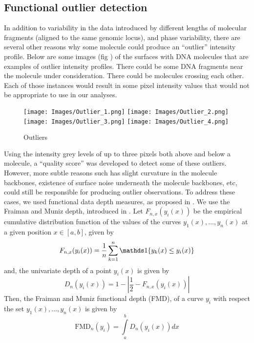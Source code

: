 \subsection{Functional outlier detection} \label{ch3_outlier}
In addition to variability in the data introduced by different lengths of molecular fragments (aligned to the same genomic locus), and phase variability, there are several other reasons why some molecule could produce an ``outlier'' intensity profile. Below are some images (fig \cite{fig:Fig3_OutlierImages}) of the surfaces with DNA molecules that are examples of outlier intensity profiles. There could be some DNA fragments near the molecule under consideration. There could be molecules crossing each other. Each of those instances would result in some pixel intensity values that would not be appropriate to use in our analyses. 
\begin{figure}[H]
\begin{center}
\texttt{[image: Images/Outlier\_1.png]}
\texttt{[image: Images/Outlier\_2.png]}
\texttt{[image: Images/Outlier\_3.png]}
\texttt{[image: Images/Outlier\_4.png]}
\end{center}
\caption{Outliers}
\label{fig:Fig3_OutlierImages}
\end{figure}
Using the intensity grey levels of up to three pixels both above and below a molecule, a ``quality score'' was developed to detect some of these outliers. However, more subtle reasons such has slight curvature in the molecule backbones, existence of surface noise underneath the molecule backbones, etc, could still be responsible for producing outlier observations. To address these cases, we used functional data depth measures, as proposed in \cite{Febrero-Bande_etal_2007_Environmetrics}. We use the Fraiman and Muniz depth, introduced in \cite{Fraiman_Muniz_2001_SEIO}. Let $F_{n,x} (y_i (x))$ be the empirical cumulative distribution function of the values of the curves $y_1(x), \dots , y_n(x)$ at a given position $x \in [a, b]$, given by
\[ F_{n,x} (y_i (x)) = \frac{1}{n}\sum\limits_{k=1}^{n} \Ind\{ y_k(x) \leq y_i(x)\}\]
and, the univariate depth of a point $y_i(x)$ is given by
\[ D_n(y_i(x)) = 1 - \left| \frac{1}{2} - F_{n,x} (y_i (x)) \right| \]
Then, the Fraiman and Muniz functional depth (FMD), of a curve $y_i$ with respect the set $y_1(x), \dots , y_n(x)$ is given by 
\begin{equation}
\text{FMD}_n(y_i) = \int\limits_a^b D_n(y_i(x)) dx
\label{eq:3_depth}
\end{equation}
